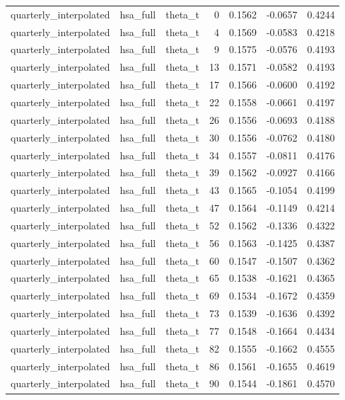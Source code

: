 \begin{tabular}{lllrrrr}
quarterly\_interpolated & hsa\_full & theta\_t & 0 & 0.1562 & -0.0657 & 0.4244 \\
quarterly\_interpolated & hsa\_full & theta\_t & 4 & 0.1569 & -0.0583 & 0.4218 \\
quarterly\_interpolated & hsa\_full & theta\_t & 9 & 0.1575 & -0.0576 & 0.4193 \\
quarterly\_interpolated & hsa\_full & theta\_t & 13 & 0.1571 & -0.0582 & 0.4193 \\
quarterly\_interpolated & hsa\_full & theta\_t & 17 & 0.1566 & -0.0600 & 0.4192 \\
quarterly\_interpolated & hsa\_full & theta\_t & 22 & 0.1558 & -0.0661 & 0.4197 \\
quarterly\_interpolated & hsa\_full & theta\_t & 26 & 0.1556 & -0.0693 & 0.4188 \\
quarterly\_interpolated & hsa\_full & theta\_t & 30 & 0.1556 & -0.0762 & 0.4180 \\
quarterly\_interpolated & hsa\_full & theta\_t & 34 & 0.1557 & -0.0811 & 0.4176 \\
quarterly\_interpolated & hsa\_full & theta\_t & 39 & 0.1562 & -0.0927 & 0.4166 \\
quarterly\_interpolated & hsa\_full & theta\_t & 43 & 0.1565 & -0.1054 & 0.4199 \\
quarterly\_interpolated & hsa\_full & theta\_t & 47 & 0.1564 & -0.1149 & 0.4214 \\
quarterly\_interpolated & hsa\_full & theta\_t & 52 & 0.1562 & -0.1336 & 0.4322 \\
quarterly\_interpolated & hsa\_full & theta\_t & 56 & 0.1563 & -0.1425 & 0.4387 \\
quarterly\_interpolated & hsa\_full & theta\_t & 60 & 0.1547 & -0.1507 & 0.4362 \\
quarterly\_interpolated & hsa\_full & theta\_t & 65 & 0.1538 & -0.1621 & 0.4365 \\
quarterly\_interpolated & hsa\_full & theta\_t & 69 & 0.1534 & -0.1672 & 0.4359 \\
quarterly\_interpolated & hsa\_full & theta\_t & 73 & 0.1539 & -0.1636 & 0.4392 \\
quarterly\_interpolated & hsa\_full & theta\_t & 77 & 0.1548 & -0.1664 & 0.4434 \\
quarterly\_interpolated & hsa\_full & theta\_t & 82 & 0.1555 & -0.1662 & 0.4555 \\
quarterly\_interpolated & hsa\_full & theta\_t & 86 & 0.1561 & -0.1655 & 0.4619 \\
quarterly\_interpolated & hsa\_full & theta\_t & 90 & 0.1544 & -0.1861 & 0.4570 \\

\end{tabular}
